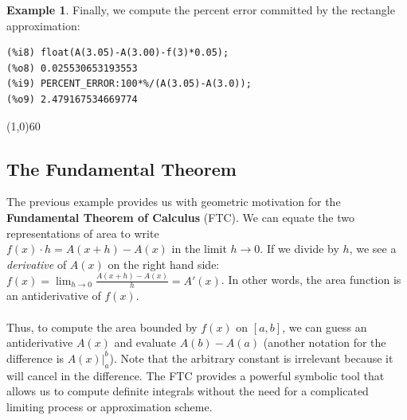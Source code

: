 \documentclass[10.5pt,twoside]{report}
\theoremstyle{definition}
\newtheorem{exmp}{Example}[section]
\begin{document}
\begin{exmp}
Finally, we compute the percent error committed by the rectangle approximation:

\begin{verbatim}
(%i8) float(A(3.05)-A(3.00)-f(3)*0.05);
(%o8) 0.025530653193553
(%i9) PERCENT_ERROR:100*%/(A(3.05)-A(3.0));
(%o9) 2.479167534669774
\end{verbatim}


\end{exmp}

\line(1,0){60}
\linethickness{0.5mm}


\subsection{The Fundamental Theorem}

The previous example provides us with geometric motivation for the \textbf{Fundamental Theorem of Calculus} (FTC).  We can equate the two representations of area to write \\
$f(x)\cdot h = A(x+h)-A(x)$ in the limit $h \to 0$.  If we divide by $h$, we see a \textit{derivative} of $A(x)$ on the right hand side:  $f(x)=\displaystyle \lim_{h \to 0} \frac {A(x+h)-A(x)}{h} = A'(x)$.  In other words, the area function is an antiderivative of $f(x)$.  \\
${}$\\
Thus, to compute the area bounded by $f(x)$ on $[a,b]$, we can guess an antiderivative $A(x)$ and evaluate $A(b)-A(a)$ (another notation for the difference is $A(x)|_a^b$).  Note that the arbitrary constant is irrelevant because it will cancel in the difference.  The FTC provides a powerful symbolic tool that allows us to compute definite integrals without the need for a complicated limiting process or approximation scheme.
\end{document}
